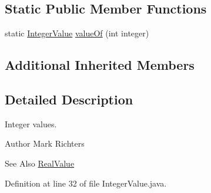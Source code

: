 \subsection*{Static Public Member Functions}
\begin{DoxyCompactItemize}
\item 
static \hyperlink{classorg_1_1tzi_1_1use_1_1uml_1_1ocl_1_1value_1_1_integer_value}{Integer\-Value} \hyperlink{classorg_1_1tzi_1_1use_1_1uml_1_1ocl_1_1value_1_1_integer_value_a13b3daedc0354fee49f124cefc08f15d}{value\-Of} (int integer)
\end{DoxyCompactItemize}
\subsection*{Additional Inherited Members}


\subsection{Detailed Description}
Integer values.

\begin{DoxyAuthor}{Author}
Mark Richters 
\end{DoxyAuthor}
\begin{DoxySeeAlso}{See Also}
\hyperlink{classorg_1_1tzi_1_1use_1_1uml_1_1ocl_1_1value_1_1_real_value}{Real\-Value} 
\end{DoxySeeAlso}


Definition at line 32 of file Integer\-Value.\-java.



